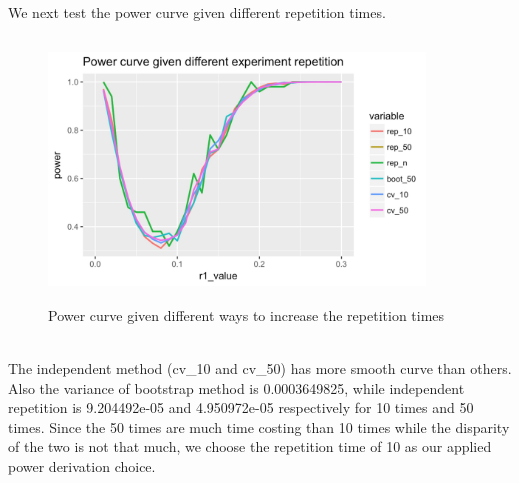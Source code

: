 \documentclass[10pt,english]{article}\usepackage{graphicx, color}
\numberwithin{equation}{section}
\numberwithin{figure}{section}
\begin{document}
We next test the power curve given different repetition times.
\begin{figure}[htbp] 
\centering\includegraphics[width=10cm,height=7cm]{line}
\caption{Power curve given different ways to increase the repetition times}
\end{figure}
\quad\\
The independent method (cv\_10 and cv\_50) has more smooth curve than others. Also the variance of bootstrap method is 0.0003649825, while independent repetition is 9.204492e-05  and 4.950972e-05 respectively for 10 times and 50 times. Since the 50 times are much time costing than 10 times while the disparity of the two is not that much, we choose the repetition time of 10 as our applied power derivation choice.
\end{document}
